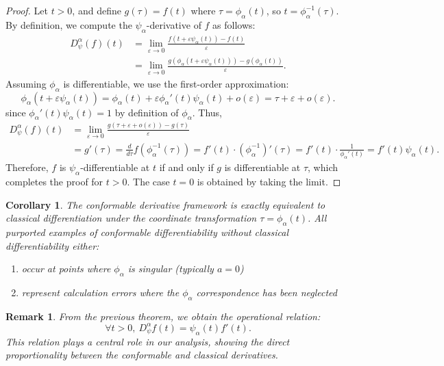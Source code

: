 \documentclass[preprint,12pt]{elsarticle}
\newtheorem{corollary}{Corollary}
\newtheorem{remark}{Remark}
\newtheorem{proof}{Proof}
\begin{document}
\begin{proof}
Let \( t > 0 \), and define \( g(\tau) = f(t) \) where \(\tau = \phi_{\alpha}(t)\), so \( t = \phi_{\alpha}^{-1}(\tau) \). By definition, we compute the $ \psi_{\alpha} $-derivative of \( f \) as follows:
\begin{align*}
D^{\alpha}_{\psi}(f)(t) &= \lim_{\varepsilon \to 0} \frac{f(t + \varepsilon \psi_{\alpha}(t)) - f(t)}{\varepsilon} \\
                        &= \lim_{\varepsilon \to 0} \frac{g(\phi_{\alpha}(t + \varepsilon \psi_{\alpha}(t))) - g(\phi_{\alpha}(t))}{\varepsilon}.
\end{align*}
Assuming \( \phi_{\alpha} \) is differentiable, we use the first-order approximation:
\[
\phi_{\alpha}(t + \varepsilon \psi_{\alpha}(t)) = \phi_{\alpha}(t) + \varepsilon \phi_{\alpha}'(t) \psi_{\alpha}(t) + o(\varepsilon) = \tau + \varepsilon + o(\varepsilon).
\]
since \(\phi_{\alpha}'(t) \psi_{\alpha}(t) = 1\) by definition of \(\phi_{\alpha}\). Thus,
\begin{align*}
D^{\alpha}_{\psi}(f)(t)
&= \lim_{\varepsilon \to 0} \frac{g(\tau + \varepsilon + o(\varepsilon)) - g(\tau)}{\varepsilon} \\
&= g'(\tau) = \frac{d}{d\tau} f(\phi_{\alpha}^{-1}(\tau)) = f'(t) \cdot (\phi_{\alpha}^{-1})'(\tau) = f'(t) \cdot \frac{1}{\phi_{\alpha}'(t)} = f'(t) \psi_{\alpha}(t).
\end{align*}
Therefore, \( f \) is \( \psi_{\alpha} \)-differentiable at \( t \) if and only if \( g \) is differentiable at \( \tau \), which completes the proof for \(t>0\). The case \(t=0\) is obtained by taking the limit.
\end{proof}

\begin{corollary}
The conformable derivative framework is exactly equivalent to classical differentiation under the coordinate transformation $\tau = \phi_\alpha(t)$. All purported examples of conformable differentiability without classical differentiability either:
\begin{enumerate}
    \item occur at points where $\phi_\alpha$ is singular (typically $a=0$)
    \item represent calculation errors where the $\phi_\alpha$ correspondence has been neglected
\end{enumerate}
\end{corollary}
\begin{remark}\label{rem1}
 From the previous theorem, we obtain the operational relation:
\begin{equation}\label{psi_C}
\forall t>0,\ D^{\alpha}_{\psi}f(t)=\psi_{\alpha}(t)f'(t).
\end{equation}
This relation plays a central role in our analysis, showing the direct proportionality between the conformable and classical derivatives.
\end{remark}
\end{document}

